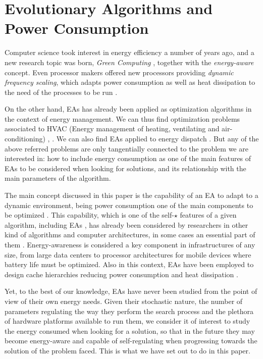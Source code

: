 \section{Evolutionary Algorithms and Power Consumption}
\label{eas}

Computer science took interest in energy efficiency a number of years
ago, and a new research topic was born, \textit{Green Computing}
\cite{green-computing}, together with the \textit{energy-aware}
\cite{energyaware,energy-aware} concept. Even processor 
makers offered new processors providing \textit{dynamic frequency
  scaling}, which adapts power consumption as well as heat dissipation
to the need of the processes to be run \cite{scaling,dynamic-scaling,energy-efficient}. 

On the other hand, EAs has already been applied as optimization
algorithms in the context of energy management.  We can thus find
optimization problems associated to HVAC (Energy management of
heating, ventilating and air-conditioning) \cite{HVAC},
\cite{chiller}.  We can also find EAs applied to energy dispatch
\cite{dispatch}.  But any of the above referred problems are only
tangentially connected to the problem we are interested in:  how to
include energy consumption as one of the main features of EAs to be
considered when looking for solutions, and its relationship with the
main parameters of the algorithm. 

The main concept discussed in this paper is the capability of an EA to adapt
to a dynamic environment, being power consumption one of the main
components to be optimized \cite{self}. This capability, which
is one of the self-$\star$ features of a
given algorithm, including EAs \cite{self}, has already been
considered by researchers in other kind of algorithms and computer architectures, in some cases
an essential part of them \cite{energy-aware}. Energy-awareness is
considered a key
component in infrastructures of any size, from large data centers to
processor architectures for mobile devices where battery life must be
optimized.  Also in this context, EAs have been employed to design
cache hierarchies reducing power consumption and heat dissipation
\cite{cache}. 

Yet, to the best of our knowledge, EAs have never been studied from
the point of view of their own energy needs. 
Given their stochastic nature, the number of parameters regulating the
way they perform the search process and the plethora of hardware
platforms available to run them, we consider it of interest to study
the energy consumed when looking for a solution, so that in the future
they may become energy-aware and capable of self-regulating when
progressing towards the solution of the problem faced. This is what we
have set out to do in this paper.

